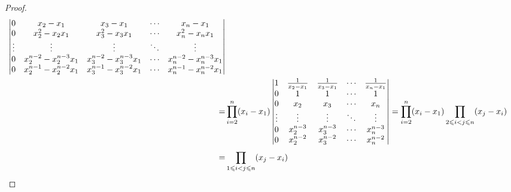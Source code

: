 \begin{proof}
\begin{align*}
\begin{vmatrix}
			0 & x_2-x_1 & x_3-x_1 & \cdots & x_n-x_1 \\
			0 & x_2^2-x_2x_1 & x_3^2-x_3x_1 & \cdots & x_n^2-x_nx_1 \\
			\vdots & \vdots & \vdots & \ddots & \vdots \\
			0 & x_2^{n-2}-x_2^{n-3}x_1 & x_3^{n-2}-x_3^{n-3}x_1 & \cdots & x_n^{n-2}-x_n^{n-3}x_1 \\
			0 & x_2^{n-1}-x_2^{n-2}x_1 & x_3^{n-1}-x_3^{n-2}x_1 & \cdots & x_n^{n-1}-x_n^{n-2}x_1
		\end{vmatrix} \\
		=&\prod_{i=2}^{n}(x_i-x_1)
		\begin{vmatrix}
			1 & \frac{1}{x_2-x_1} & \frac{1}{x_3-x_1} & \cdots & \frac{1}{x_n-x_1} \\
			0 & 1 & 1 & \cdots & 1 \\
			0 & x_2& x_3 & \cdots & x_n \\
			\vdots & \vdots & \vdots & \ddots & \vdots \\
			0 & x_2^{n-3} & x_3^{n-3}& \cdots & x_n^{n-3}\\
			0 & x_2^{n-2} & x_3^{n-2} & \cdots & x_n^{n-2}
		\end{vmatrix} 
		=\prod_{i=2}^{n}(x_i-x_1)\prod_{2\leqslant i<j\leqslant n}(x_j-x_i) \\
		=&\prod_{1\leqslant i<j\leqslant n}^{}(x_j-x_i)\qedhere
	\end{align*}
\end{proof}


